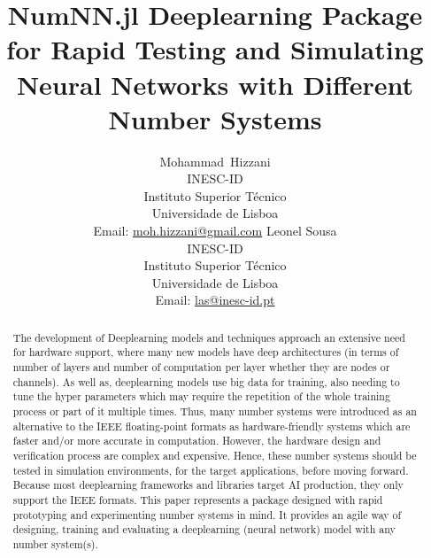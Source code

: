 \documentclass{article}
\title{NumNN.jl Deeplearning Package for Rapid Testing and Simulating Neural Networks with Different Number Systems}
\author{%
	{Mohammad~Hizzani}\\
	INESC-ID\\ 
	Instituto Superior Técnico\\ 
		Universidade de Lisboa\\
		Email: \href{mailto:moh.hizzani@gmail.com}{moh.hizzani@gmail.com}%
	\And
	{Leonel Sousa}\\
	INESC-ID\\ 
		Instituto Superior Técnico\\ 
		Universidade de Lisboa\\
		Email: \href{mailto:las@inesc-id.pt}{las@inesc-id.pt}%
}
\begin{document}
	\maketitle

	\begin{abstract}
		The development of Deeplearning models and techniques approach an extensive need for hardware support, where many new models have deep architectures (in terms of number of layers and number of computation per layer whether they are nodes or channels). As well as, deeplearning models use big data for training, also needing to tune the hyper parameters which may require the repetition of the whole training process or part of it multiple times. Thus, many number systems were introduced as an alternative to the IEEE floating-point formats as hardware-friendly systems which are faster and/or more accurate in computation. However, the hardware design and verification process are complex and expensive. Hence, these number systems should be tested in simulation environments, for the target applications, before moving forward. Because most deeplearning frameworks and libraries target AI production, they only support the IEEE formats. This paper represents a package designed with rapid prototyping and experimenting number systems in mind. It provides an agile way of designing, training and evaluating a deeplearning (neural network) model with any number system(s).
	\end{abstract}

	
	
	
	
	
%	
	
	
	
\end{document}
